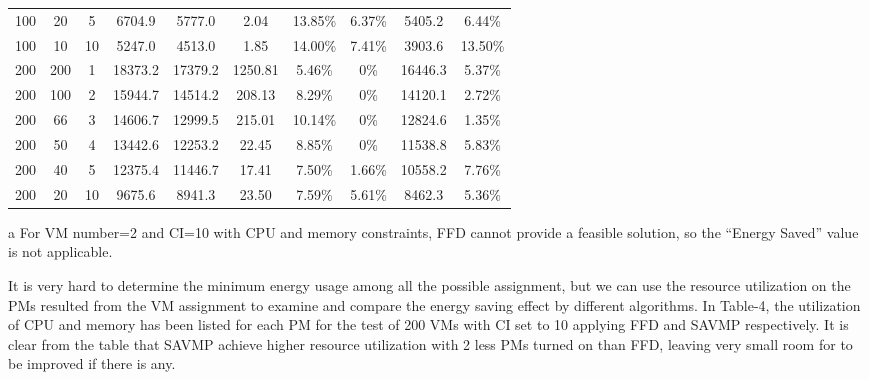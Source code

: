 \documentclass[10pt, conference, compsocconf]{IEEEtran}
\begin{document}
\begin{table*}[t]
\begin{center}
\begin{threeparttable}
\begin{tabular}{c|c|c|c|c|c|c|c|c|c}
100 &20 & 5 & 6704.9 & 5777.0 & 2.04 & 13.85\% & 6.37\% & 5405.2 & 6.44\%\\
100 &10 & 10 & 5247.0 & 4513.0 & 1.85 & 14.00\% & 7.41\% & 3903.6 & 13.50\%\\
\hline
200 &200 & 1 & 18373.2 & 17379.2 & 1250.81 & 5.46\% & 0\% & 16446.3 & 5.37\%\\
200 &100 & 2 & 15944.7 & 14514.2 & 208.13 & 8.29\% & 0\% & 14120.1 & 2.72\%\\
200 &66  & 3 & 14606.7 & 12999.5 & 215.01 & 10.14\% & 0\% & 12824.6 & 1.35\%\\
200 &50  & 4 & 13442.6 & 12253.2 & 22.45 & 8.85\% & 0\% & 11538.8 & 5.83\%\\
200 &40  & 5 & 12375.4 & 11446.7 & 17.41 & 7.50\% & 1.66\% & 10558.2 & 7.76\%\\
200 &20  & 10 & 9675.6 & 8941.3 & 23.50 & 7.59\% & 5.61\% & 8462.3 & 5.36\%

\end{tabular}
\begin{tablenotes}
\item [a] For VM number=2 and CI=10 with CPU and memory constraints, FFD cannot
provide a feasible solution, so the ``Energy Saved'' value is not applicable.
\end{tablenotes}
\end{threeparttable}

\end{center}
\end{table*}


\newpage
It is very hard to determine the minimum energy usage among all the possible
assignment, but we can use the resource utilization on the PMs resulted from the
VM assignment to examine and compare the energy saving effect by different
algorithms. In Table-4, the utilization of CPU and memory has been
listed for each PM for the test of 200 VMs with CI set to 10 applying FFD and
SAVMP respectively. It is clear from the table that SAVMP achieve higher
resource utilization with 2 less PMs turned on than FFD, leaving very small
room for to be improved if there is any.
\end{document}
